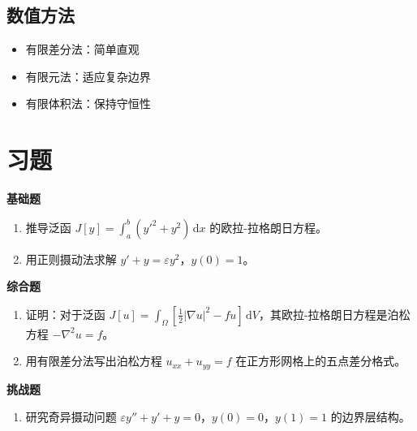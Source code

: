 \subsection{数值方法}

\begin{itemize}
    \item 有限差分法：简单直观
    \item 有限元法：适应复杂边界
    \item 有限体积法：保持守恒性
\end{itemize}

\section{习题}

\textbf{基础题}

\begin{enumerate}
    \item 推导泛函 $J[y] = \int_a^b (y'^2 + y^2)\,\mathrm{d}x$ 的欧拉-拉格朗日方程。
    
    \item 用正则摄动法求解 $y' + y = \varepsilon y^2$，$y(0) = 1$。
\end{enumerate}

\textbf{综合题}

\begin{enumerate}[resume]
    \item 证明：对于泛函 $J[u] = \int_\Omega \left[\frac{1}{2}|\nabla u|^2 - fu\right]\,\mathrm{d}V$，其欧拉-拉格朗日方程是泊松方程 $-\nabla^2 u = f$。
    
    \item 用有限差分法写出泊松方程 $u_{xx} + u_{yy} = f$ 在正方形网格上的五点差分格式。
\end{enumerate}

\textbf{挑战题}

\begin{enumerate}[resume]
    \item 研究奇异摄动问题 $\varepsilon y'' + y' + y = 0$，$y(0) = 0$，$y(1) = 1$ 的边界层结构。
\end{enumerate}
